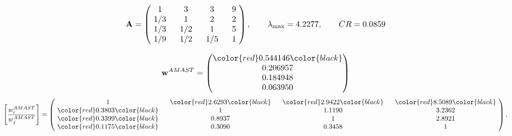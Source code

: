 \begin{example}
\begin{equation*}
\mathbf{A} =
\begin{pmatrix}
$\,\,$ 1 $\,\,$ & $\,\,$3$\,\,$ & $\,\,$3$\,\,$ & $\,\,$9 $\,\,$ \\
$\,\,$ 1/3$\,\,$ & $\,\,$ 1 $\,\,$ & $\,\,$2$\,\,$ & $\,\,$2 $\,\,$ \\
$\,\,$ 1/3$\,\,$ & $\,\,$ 1/2$\,\,$ & $\,\,$ 1 $\,\,$ & $\,\,$5 $\,\,$ \\
$\,\,$ 1/9$\,\,$ & $\,\,$ 1/2$\,\,$ & $\,\,$ 1/5$\,\,$ & $\,\,$ 1  $\,\,$ \\
\end{pmatrix},
\qquad
\lambda_{\max} =
4.2277,
\qquad
CR = 0.0859
\end{equation*}

\begin{equation*}
\mathbf{w}^{AMAST} =
\begin{pmatrix}
\color{red} 0.544146\color{black} \\
0.206957\\
0.184948\\
0.063950
\end{pmatrix}\end{equation*}
\begin{equation*}
\left[ \frac{{w}^{AMAST}_i}{{w}^{AMAST}_j} \right] =
\begin{pmatrix}
$\,\,$ 1 $\,\,$ & $\,\,$\color{red} 2.6293\color{black} $\,\,$ & $\,\,$\color{red} 2.9422\color{black} $\,\,$ & $\,\,$\color{red} 8.5089\color{black} $\,\,$ \\
$\,\,$\color{red} 0.3803\color{black} $\,\,$ & $\,\,$ 1 $\,\,$ & $\,\,$1.1190$\,\,$ & $\,\,$3.2362  $\,\,$ \\
$\,\,$\color{red} 0.3399\color{black} $\,\,$ & $\,\,$0.8937$\,\,$ & $\,\,$ 1 $\,\,$ & $\,\,$2.8921 $\,\,$ \\
$\,\,$\color{red} 0.1175\color{black} $\,\,$ & $\,\,$0.3090$\,\,$ & $\,\,$0.3458$\,\,$ & $\,\,$ 1  $\,\,$ \\
\end{pmatrix},
\end{equation*}


\end{example}
